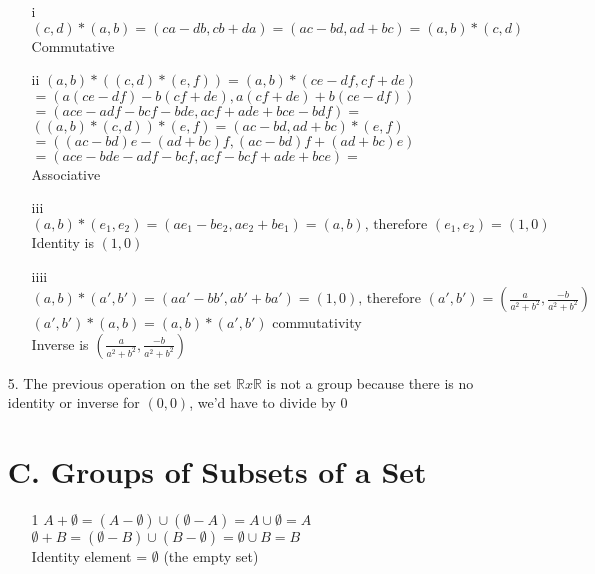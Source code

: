 \begin{enumerate}
\begin{enumerate}

\item[i]
$(c,d)*(a,b)=(ca-db,cb+da)=(ac-bd,ad+bc)=(a,b)*(c,d)$ \\
Commutative

\item[ii]
$(a,b)*((c,d)*(e,f))=(a,b)*(ce-df,cf+de)$ \\
$=(a(ce-df)-b(cf+de),a(cf+de)+b(ce-df))$ \\
$=(ace-adf-bcf-bde, acf+ade+bce-bdf)=$ \\
$((a,b)*(c,d))*(e,f)=(ac-bd,ad+bc)*(e,f)$ \\
$=((ac-bd)e-(ad+bc)f,(ac-bd)f+(ad+bc)e)$ \\
$=(ace-bde-adf-bcf, acf-bcf+ade+bce)=$ \\
Associative

\item[iii]
$(a,b)*(e_{1},e_{2})=(ae_{1}-be_{2},ae_{2}+be_{1})=(a,b) \text{, therefore } (e_{1},e_{2})=(1,0)$ \\
Identity is $(1,0)$

\item[iiii]
$(a,b)*(a',b')=(aa'-bb',ab'+ba')=(1,0) \text{, therefore } (a',b')=(\frac{a}{a^2+b^2},\frac{-b}{a^2+b^2})$ \\
$(a',b')*(a,b)=(a,b)*(a',b')$ commutativity \\
Inverse is $(\frac{a}{a^2+b^2},\frac{-b}{a^2+b^2})$

\end{enumerate}

\item[5.]
The previous operation on the set $\mathbb{R} x \mathbb{R}$ is not a group because there is no identity or inverse for $(0,0)$, we'd have to divide by $0$ \\

\section*{C. Groups of Subsets of a Set}

\begin{enumerate}

\item[1]
$A+\emptyset=(A-\emptyset) \cup (\emptyset - A) = A \cup \emptyset = A$ \\
$\emptyset + B=( \emptyset - B) \cup (B - \emptyset ) = \emptyset \cup B = B$ \\
Identity element = $\emptyset$ (the empty set)


\end{enumerate}
\end{enumerate}
